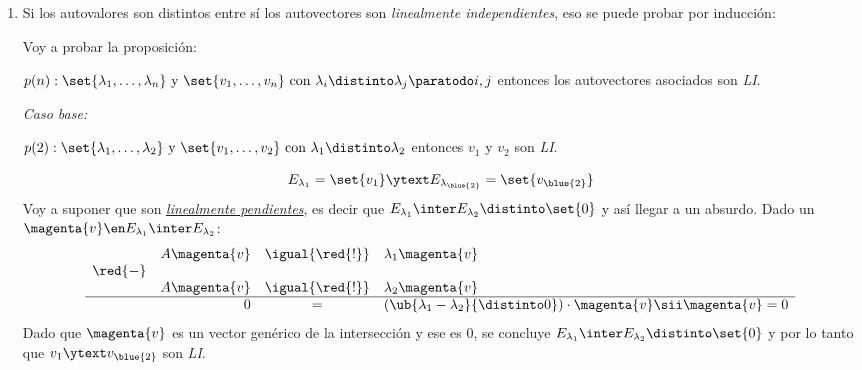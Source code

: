 \begin{enumerate}[label=\alph*)]
  \item Si los autovalores son distintos entre sí los autovectores son \textit{linealmente independientes}, eso
        se puede probar por inducción:

        Voy a probar la proposición:
        \begin{center}
          $p(n):
            \set{\lambda_1, \ldots, \lambda_n}
            \text{ y }
            \set{v_1, \ldots, v_n}
            \text{ con } \lambda_i \distinto \lambda_j \paratodo i, j$
          entonces los autovectores asociados son \textit{LI}.
        \end{center}

        \bigskip

        \textit{Caso base:}
        \begin{center}
          $p(2):
            \set{\lambda_1, \ldots, \lambda_2}
            \text{ y }
            \set{v_1, \ldots, v_2}
            \text{ con } \lambda_1 \distinto \lambda_2$
          entonces $v_1$ y $v_2$ son \textit{LI}.
        \end{center}
        $$
          E_{\lambda_1} = \set{v_1}
          \ytext
          E_{\lambda_{\blue{2}}} = \set{v_{\blue{2}}}
        $$
        Voy a suponer que son \textit{\underline{linealmente pendientes}}, es decir que
        $E_{\lambda_1} \inter E_{\lambda_2} \distinto \set{0}$ y así llegar a un absurdo.
        Dado un $\magenta{v} \en E_{\lambda_1} \inter E_{\lambda_2}$:
        $$
          \begin{array}{rrcl}
                    & A\magenta{v} & \igual{\red{!}} & \lambda_1 \magenta{v}                                                            \\
            \red{-} &              &                 &                                                                                  \\
                    & A\magenta{v} & \igual{\red{!}} & \lambda_2 \magenta{v}                                                            \\\hline
                    & 0            & =               & (\ub{\lambda_1 - \lambda_2}{\distinto 0}) \cdot \magenta{v} \sii \magenta{v} = 0
          \end{array}
        $$
        Dado que $\magenta{v}$ es un vector genérico de la intersección y ese es 0,
        se concluye $E_{\lambda_1} \inter E_{\lambda_2} \distinto \set{0}$ y por lo tanto que
        $v_1 \ytext v_{\blue{2}}$ son \textit{LI}.


\end{enumerate}
